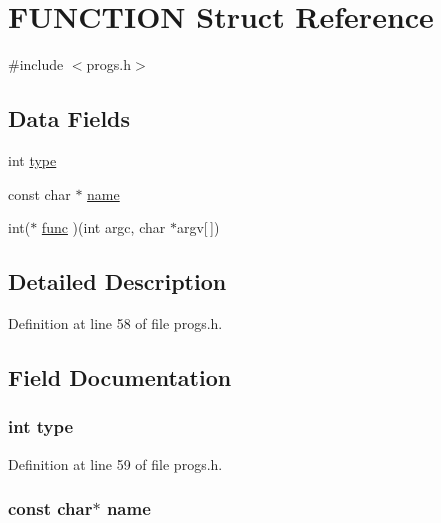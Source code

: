 \hypertarget{struct_f_u_n_c_t_i_o_n}{}\section{F\+U\+N\+C\+T\+I\+ON Struct Reference}
\label{struct_f_u_n_c_t_i_o_n}


{\ttfamily \#include $<$progs.\+h$>$}

\subsection*{Data Fields}
\begin{DoxyCompactItemize}
\item 
int \hyperlink{struct_f_u_n_c_t_i_o_n_ac765329451135abec74c45e1897abf26}{type}
\item 
const char $\ast$ \hyperlink{struct_f_u_n_c_t_i_o_n_a8f8f80d37794cde9472343e4487ba3eb}{name}
\item 
int($\ast$ \hyperlink{struct_f_u_n_c_t_i_o_n_a2093e5f7c7c03ae9d346f4e8e3c41d75}{func} )(int argc, char $\ast$argv\mbox{[}$\,$\mbox{]})
\end{DoxyCompactItemize}


\subsection{Detailed Description}


Definition at line 58 of file progs.\+h.



\subsection{Field Documentation}
\subsubsection[{\texorpdfstring{type}{type}}]{\setlength{\rightskip}{0pt plus 5cm}int type}\hypertarget{struct_f_u_n_c_t_i_o_n_ac765329451135abec74c45e1897abf26}{}\label{struct_f_u_n_c_t_i_o_n_ac765329451135abec74c45e1897abf26}


Definition at line 59 of file progs.\+h.

\subsubsection[{\texorpdfstring{name}{name}}]{\setlength{\rightskip}{0pt plus 5cm}const char$\ast$ name}\hypertarget{struct_f_u_n_c_t_i_o_n_a8f8f80d37794cde9472343e4487ba3eb}{}\label{struct_f_u_n_c_t_i_o_n_a8f8f80d37794cde9472343e4487ba3eb}


